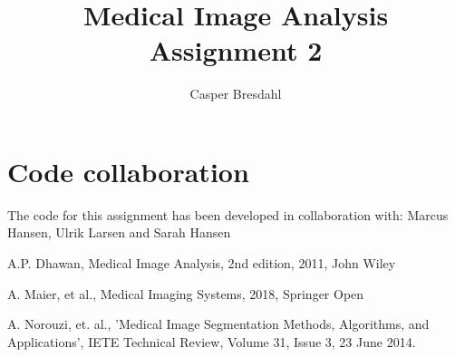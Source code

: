 \documentclass[runningheads]{llncs}
\begin{document}
%
\title{Medical Image Analysis Assignment 2}
%
%
\author{Casper Bresdahl}
%
%
%
\maketitle              %
%






\newpage
\section{Code collaboration}
The code for this assignment has been developed in collaboration with: Marcus Hansen, Ulrik Larsen and Sarah Hansen
%
%
%
% 
% 
%
\begin{thebibliography}{8}
A.P. Dhawan, Medical Image Analysis, 2nd edition, 2011, John Wiley

A. Maier, et al., Medical Imaging Systems, 2018, Springer Open

A. Norouzi, et. al., 'Medical Image Segmentation Methods, Algorithms, and Applications', IETE Technical Review, Volume 31, Issue 3, 23 June 2014.

\end{thebibliography}
\end{document}
